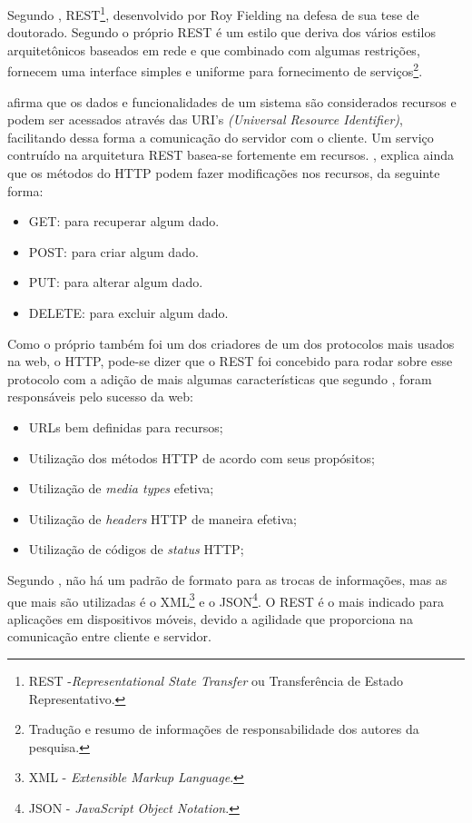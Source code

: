	
	\par Segundo , REST\footnote{REST
-\textit{Representational State Transfer} ou Transferência de Estado
Representativo.}, desenvolvido por Roy Fielding na defesa de sua tese de
doutorado. Segundo o próprio  REST é um estilo que
deriva dos vários estilos arquitetônicos baseados em rede e  que combinado com
algumas restrições, fornecem uma interface simples e uniforme para fornecimento
de serviços\footnote{Tradução e resumo de informações de responsabilidade dos
autores da pesquisa.}.
			
	\par {} afirma que os dados e funcionalidades de um sistema
são considerados recursos e podem ser acessados através das URI's
\textit{(Universal Resource Identifier)}, facilitando dessa forma a comunicação
do servidor com o cliente. Um serviço contruído na arquitetura REST basea-se
fortemente em recursos. , explica ainda que os métodos
do HTTP podem fazer modificações nos recursos, da seguinte forma:
	
	\begin{itemize}
		\item GET: para recuperar algum dado. 
		\item POST: para criar algum dado.
		\item PUT: para alterar algum dado. 
		\item DELETE: para excluir algum dado. 
	\end{itemize}

	\par Como o próprio  também foi um dos criadores de
um dos protocolos mais usados na web, o HTTP, pode-se dizer que o REST foi
concebido para rodar sobre esse protocolo com a adição de mais algumas
características que segundo , foram responsáveis pelo
sucesso da web:
		
	\begin{itemize}
		\item URLs bem definidas para recursos;
		\item Utilização dos métodos HTTP de acordo com seus propósitos;
		\item Utilização de \textit{media types} efetiva;
		\item Utilização de \textit{headers} HTTP de maneira efetiva;
		\item Utilização de códigos de \textit{status} HTTP;
	\end{itemize}
			 
	\par Segundo , não há um padrão de formato para as
 trocas de informações, mas as que mais são utilizadas é o XML\footnote{XML
 - \textit{Extensible Markup Language}.} e o JSON\footnote{JSON - 
 \textit{JavaScript Object Notation}.}. O REST é o mais indicado para aplicações
 em dispositivos móveis, devido a agilidade que proporciona na comunicação
 entre cliente e servidor.
